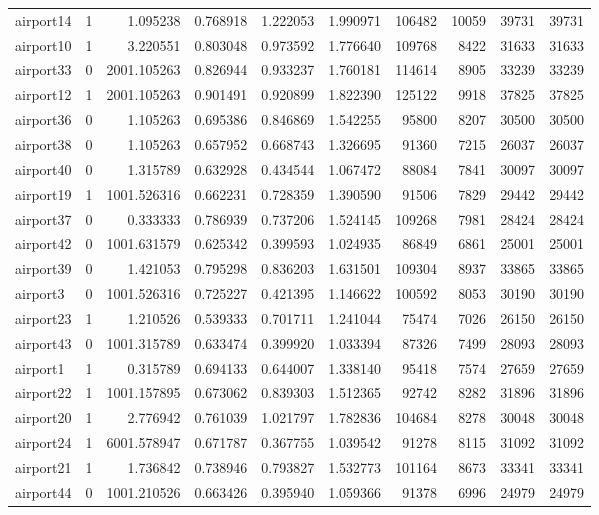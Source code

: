 \documentclass[../../../thesis.tex]{subfiles}
\begin{document}
\begin{longtable}{|l|r|r|r|r|r|r|r|r|r|}
airport14 & 1 & 1.095238 & 0.768918 & 1.222053 & 1.990971 & 106482 & 10059 & 39731 & 39731 \\
airport10 & 1 & 3.220551 & 0.803048 & 0.973592 & 1.776640 & 109768 & 8422 & 31633 & 31633 \\
airport33 & 0 & 2001.105263 & 0.826944 & 0.933237 & 1.760181 & 114614 & 8905 & 33239 & 33239 \\
airport12 & 1 & 2001.105263 & 0.901491 & 0.920899 & 1.822390 & 125122 & 9918 & 37825 & 37825 \\
airport36 & 0 & 1.105263 & 0.695386 & 0.846869 & 1.542255 & 95800 & 8207 & 30500 & 30500 \\
airport38 & 0 & 1.105263 & 0.657952 & 0.668743 & 1.326695 & 91360 & 7215 & 26037 & 26037 \\
airport40 & 0 & 1.315789 & 0.632928 & 0.434544 & 1.067472 & 88084 & 7841 & 30097 & 30097 \\
airport19 & 1 & 1001.526316 & 0.662231 & 0.728359 & 1.390590 & 91506 & 7829 & 29442 & 29442 \\
airport37 & 0 & 0.333333 & 0.786939 & 0.737206 & 1.524145 & 109268 & 7981 & 28424 & 28424 \\
airport42 & 0 & 1001.631579 & 0.625342 & 0.399593 & 1.024935 & 86849 & 6861 & 25001 & 25001 \\
airport39 & 0 & 1.421053 & 0.795298 & 0.836203 & 1.631501 & 109304 & 8937 & 33865 & 33865 \\
airport3 & 0 & 1001.526316 & 0.725227 & 0.421395 & 1.146622 & 100592 & 8053 & 30190 & 30190 \\
airport23 & 1 & 1.210526 & 0.539333 & 0.701711 & 1.241044 & 75474 & 7026 & 26150 & 26150 \\
airport43 & 0 & 1001.315789 & 0.633474 & 0.399920 & 1.033394 & 87326 & 7499 & 28093 & 28093 \\
airport1 & 1 & 0.315789 & 0.694133 & 0.644007 & 1.338140 & 95418 & 7574 & 27659 & 27659 \\
airport22 & 1 & 1001.157895 & 0.673062 & 0.839303 & 1.512365 & 92742 & 8282 & 31896 & 31896 \\
airport20 & 1 & 2.776942 & 0.761039 & 1.021797 & 1.782836 & 104684 & 8278 & 30048 & 30048 \\
airport24 & 1 & 6001.578947 & 0.671787 & 0.367755 & 1.039542 & 91278 & 8115 & 31092 & 31092 \\
airport21 & 1 & 1.736842 & 0.738946 & 0.793827 & 1.532773 & 101164 & 8673 & 33341 & 33341 \\
airport44 & 0 & 1001.210526 & 0.663426 & 0.395940 & 1.059366 & 91378 & 6996 & 24979 & 24979 \\

\end{longtable}
\end{document}
